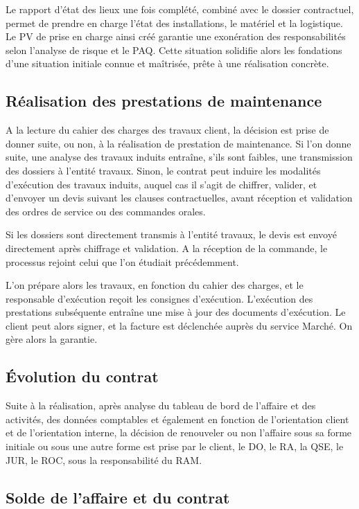 Le rapport d’état des lieux une fois complété, combiné avec le dossier contractuel, permet de prendre en charge l’état des installations, le matériel et la logistique. Le PV de prise en charge ainsi créé garantie une exonération des responsabilités selon l’analyse de risque et le PAQ. Cette situation solidifie alors les fondations d’une situation initiale connue et maîtrisée, prête à une réalisation concrète.


\subsection{Réalisation des prestations de maintenance}

A la lecture du cahier des charges des travaux client, la décision est prise de donner suite, ou non, à la réalisation de prestation de maintenance. Si l’on donne suite, une analyse des travaux induits entraîne, s’ils sont faibles, une transmission des dossiers à l’entité travaux. Sinon, le contrat peut induire les modalités d’exécution des travaux induits, auquel cas il s’agit de chiffrer, valider, et d’envoyer un devis suivant les clauses contractuelles, avant réception et validation des ordres de service ou des commandes orales.

Si les dossiers sont directement transmis à l’entité travaux, le devis est envoyé directement après chiffrage et validation. A la réception de la commande, le processus rejoint celui que l’on étudiait précédemment.

L’on prépare alors les travaux, en fonction du cahier des charges, et le responsable d’exécution reçoit les consignes d’exécution. L’exécution des prestations subséquente entraîne une mise à jour des documents d’exécution. Le client peut alors signer, et la facture est déclenchée auprès du service Marché. On gère alors la garantie.

\subsection{Évolution du contrat}

Suite à la réalisation, après analyse du tableau de bord de l’affaire et des activités, des données comptables et également en fonction de l’orientation client et de l’orientation interne, la décision de renouveler ou non l’affaire sous sa forme initiale ou sous une autre forme est prise par le client, le DO, le RA, la QSE, le JUR, le ROC, sous la responsabilité du RAM.

\subsection{Solde de l’affaire et du contrat}

